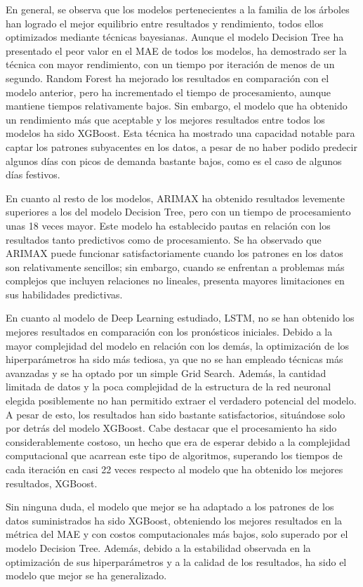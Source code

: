 \documentclass[12pt,a4paper]{report}
\begin{document}
En general, se observa que los modelos pertenecientes a la familia de los árboles han logrado el mejor equilibrio entre resultados y rendimiento, todos ellos optimizados mediante técnicas bayesianas. Aunque el modelo Decision Tree ha presentado el peor valor en el MAE de todos los modelos, ha demostrado ser la técnica con mayor rendimiento, con un tiempo por iteración de menos de un segundo. Random Forest ha mejorado los resultados en comparación con el modelo anterior, pero ha incrementado el tiempo de procesamiento, aunque mantiene tiempos relativamente bajos. Sin embargo, el modelo que ha obtenido un rendimiento más que aceptable y los mejores resultados entre todos los modelos ha sido XGBoost. Esta técnica ha mostrado una capacidad notable para captar los patrones subyacentes en los datos, a pesar de no haber podido predecir algunos días con picos de demanda bastante bajos, como es el caso de algunos días festivos.

En cuanto al resto de los modelos, ARIMAX ha obtenido resultados levemente superiores a los del modelo Decision Tree, pero con un tiempo de procesamiento unas 18 veces mayor. Este modelo ha establecido pautas en relación con los resultados tanto predictivos como de procesamiento. Se ha observado que ARIMAX puede funcionar satisfactoriamente cuando los patrones en los datos son relativamente sencillos; sin embargo, cuando se enfrentan a problemas más complejos que incluyen relaciones no lineales, presenta mayores limitaciones en sus habilidades predictivas.

En cuanto al modelo de Deep Learning estudiado, LSTM, no se han obtenido los mejores resultados en comparación con los pronósticos iniciales. Debido a la mayor complejidad del modelo en relación con los demás, la optimización de los hiperparámetros ha sido más tediosa, ya que no se han empleado técnicas más avanzadas y se ha optado por un simple Grid Search. Además, la cantidad limitada de datos y la poca complejidad de la estructura de la red neuronal elegida posiblemente no han permitido extraer el verdadero potencial del modelo. A pesar de esto, los resultados han sido bastante satisfactorios, situándose solo por detrás del modelo XGBoost. Cabe destacar que el procesamiento ha sido considerablemente costoso, un hecho que era de esperar debido a la complejidad computacional que acarrean este tipo de algoritmos, superando los tiempos de cada iteración en casi 22 veces respecto al modelo que ha obtenido los mejores resultados, XGBoost.

Sin ninguna duda, el modelo que mejor se ha adaptado a los patrones de los datos suministrados ha sido XGBoost, obteniendo los mejores resultados en la métrica del MAE y con costos computacionales más bajos, solo superado por el modelo Decision Tree. Además, debido a la estabilidad observada en la optimización de sus hiperparámetros y a la calidad de los resultados, ha sido el modelo que mejor se ha generalizado.
\end{document}
